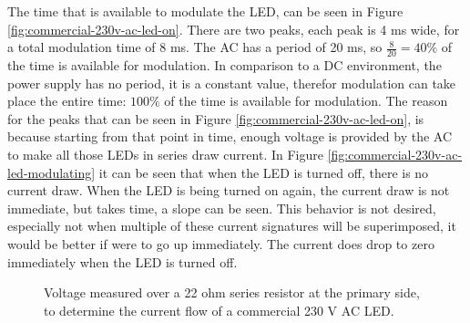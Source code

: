 The time that is available to modulate the LED, can be seen in Figure \ref{fig:commercial-230v-ac-led-on}.
There are two peaks, each peak is 4 ms wide, for a total modulation time of 8 ms.
The AC has a period of 20 ms, so $\frac{8}{20} = 40 \%$ of the time is available for modulation.
In comparison to a DC environment, the power supply has no period, it is a constant value, therefor modulation can take place the entire time: $100 \%$ of the time is available for modulation.
The reason for the peaks that can be seen in Figure \ref{fig:commercial-230v-ac-led-on}, is because starting from that point in time, enough voltage is provided by the AC to make all those LEDs in series draw current.
In Figure \ref{fig:commercial-230v-ac-led-modulating} it can be seen that when the LED is turned off, there is no current draw.
When the LED is being turned on again, the current draw is not immediate, but takes time, a slope can be seen.
This behavior is not desired, especially not when multiple of these current signatures will be superimposed, it would be better if were to go up immediately.
The current does drop to zero immediately when the LED is turned off.

\begin{figure}[tb]
	\centering     %

	\caption{Voltage measured over a 22 ohm series resistor at the primary side, to determine the current flow of a commercial 230 V AC LED.}
\end{figure}





